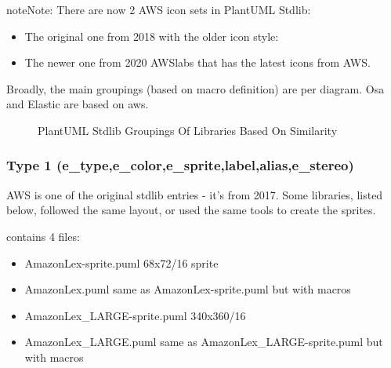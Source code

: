 \documentclass[letterpaper,10pt,english]{sphinxmanual}
\begin{document}
\begin{sphinxadmonition}{note}{Note:}
There are now 2 AWS icon sets in PlantUML Stdlib:
\begin{itemize}
\item {} 
The original one from 2018 with the older icon style: 

\item {} 
The newer one from 2020 AWSlabs  that has the latest icons from AWS.

\end{itemize}
\end{sphinxadmonition}

Broadly, the main groupings (based on macro definition) are per diagram.
Osa and Elastic are based on aws.

\begin{figure}[htbp]
\centering
\capstart

\caption{PlantUML Stdlib Groupings Of Libraries Based On Similarity}\label{\detokenize{Stdlib/StdLibOverview:id1}}\end{figure}


\subsubsection{Type 1 (e\_type,e\_color,e\_sprite,label,alias,e\_stereo)}
\label{\detokenize{Stdlib/StdLibOverview:type-1-e-type-e-color-e-sprite-label-alias-e-stereo}}
AWS is one of the original stdlib entries - it’s from 2017.
Some libraries, listed below, followed the same layout, or used the same tools to create the sprites.

 contains 4 files:
\begin{itemize}
\item {} 
AmazonLex-sprite.puml 68x72/16 sprite

\item {} 
AmazonLex.puml same as AmazonLex-sprite.puml but with macros

\item {} 
AmazonLex\_LARGE-sprite.puml 340x360/16

\item {} 
AmazonLex\_LARGE.puml same as AmazonLex\_LARGE-sprite.puml but with macros

\end{itemize}
\end{document}
